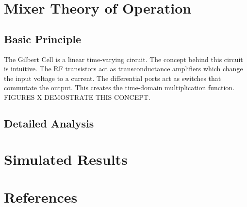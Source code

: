 \documentclass{article}                                                         %
\begin{document}
\section{Mixer Theory of Operation}
\subsection{Basic Principle}

The Gilbert Cell is a linear time-varying circuit. The concept behind this circuit is intuitive. The RF transistors act as
transconductance amplifiers which change the input voltage to a current. The differential ports act as switches that commutate the output.
This creates the time-domain multiplication function. FIGURES X DEMOSTRATE THIS CONCEPT.

\subsection{Detailed Analysis}

\section{Simulated Results}

\newpage
\section{References}
\printbibliography[heading=none]
\end{document}
